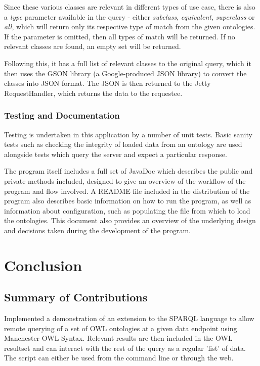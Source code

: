 \documentclass{article}
\begin{document}
Since these various classes are relevant in different types of use case, there
is also a \emph{type} parameter available in the query - either \emph{subclass},
\emph{equivalent}, \emph{superclass} or \emph{all}, which will return only its
respective type of match from the given ontologies. If the parameter is omitted,
then all types of match will be returned. If no relevant classes are found, an
empty set will be returned.

Following this, it has a full list of relevant classes to the original query,
which it then uses the GSON library\cite{gson} (a Google-produced JSON library) to convert 
the classes into JSON format. The JSON is then returned to the Jetty
RequestHandler, which returns the data to the requestee.

\subsubsection{Testing and Documentation}

Testing is undertaken in this application by a number of unit tests. Basic
sanity tests such as checking the integrity of loaded data from an ontology are
used alongside tests which query the server and expect a particular response.

The program itself includes a full set of JavaDoc which describes the public and
private methods included, designed to give an overview of the workflow of the
program and flow involved. A README file included in the distribution of the
program also describes basic information on how to run the program, as well as
information about configuration, such as populating the file from which to load
the ontologies. This document also provides an overview of the underlying design
and decisions taken during the development of the program. 

\section{Conclusion}

\subsection{Summary of Contributions}

Implemented a demonstration of an extension to the SPARQL language to allow
remote querying of a set of OWL ontologies at
a given data endpoint using Manchester OWL Syntax. Relevant results are then
included in the OWL resultset and can
interact with the rest of the query as a regular 'list' of data. The script can
either be used from the command line or
through the web.
\end{document}
